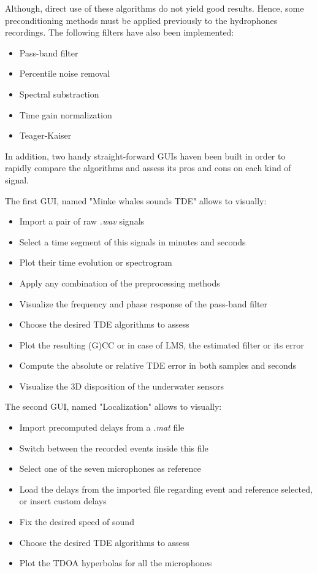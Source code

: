   Although, direct use of these algorithms do not yield good results. Hence, some preconditioning methods must be applied previously to the hydrophones recordings. The following filters have also been implemented:
  \begin{itemize}
    \item Pass-band filter
    \item Percentile noise removal
    \item Spectral substraction
    \item Time gain normalization
    \item Teager-Kaiser
  \end{itemize}
  \vspace{5pt}
  
  In addition, two handy straight-forward GUIs haven been built in order to rapidly compare the algorithms and assess its pros and cons on each kind of signal.
  
  The first GUI, named "Minke whales sounds TDE" \cite{interactiveTDE.m} allows to visually:
  \begin{itemize}
    \item Import a pair of raw \textit{.wav} signals
    \item Select a time segment of this signals in minutes and seconds
    \item Plot their time evolution or spectrogram
    \item Apply any combination of the preprocessing methods
    \item Visualize the frequency and phase response of the pass-band filter
    \item Choose the desired TDE algorithms to assess
    \item Plot the resulting (G)CC or in case of LMS, the estimated filter or its error
    \item Compute the absolute or relative TDE error in both samples and seconds
    \item Visualize the 3D disposition of the underwater sensors
  \end{itemize}
  \vspace{5pt}
  
  The second GUI, named "Localization" \cite{localization.m} allows to visually:
  \begin{itemize}
    \item Import precomputed delays from a \emph{.mat} file
    \item Switch between the recorded events inside this file
    \item Select one of the seven microphones as reference
    \item Load the delays from the imported file regarding event and reference selected, or insert custom delays
    \item Fix the desired speed of sound
    \item Choose the desired TDE algorithms to assess
    \item Plot the TDOA hyperbolas for all the microphones
  \end{itemize}
  \vspace{5pt}
